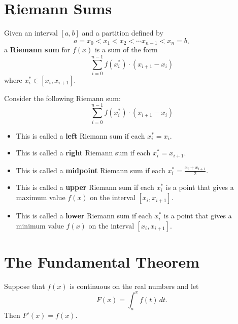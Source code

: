 \documentclass{ximera}
\renewcommand{\d}{\,d}
\begin{document}
\section{Riemann Sums}





\begin{definition}
Given an interval $[a,b]$ and a partition defined by
\[
a = x_0 < x_1 <x_2 < \cdots x_{n-1}< x_n = b,
\]
a \textbf{Riemann sum} for $f(x)$ is a sum of the form
\[
\sum_{i=0}^{n-1} f(x_i^*) \cdot (x_{i+1}-x_i)
\]
where $x_i^*\in [x_i,x_{i+1}]$.
\end{definition}




\begin{definition}
Consider the following Riemann sum:
\[
\sum_{i=0}^{n-1} f(x_i^*) \cdot (x_{i+1}-x_i)
\]
\begin{itemize}
\item This is called a \textbf{left} Riemann sum if each $x_i^* =
x_i$.
\item This is called a \textbf{right} Riemann sum if each $x_i^* =
x_{i+1}$.
\item This is called a \textbf{midpoint} Riemann sum if each $x_i^*
= \frac{x_i+x_{i+1}}{2}$.
\item This is called a \textbf{upper} Riemann sum if each $x_i^*$ is
a point that gives a maximum value $f(x)$ on the interval
$[x_i,x_{i+1}]$.
\item This is called a \textbf{lower} Riemann sum if each $x_i^*$ is a
point that gives a minimum value $f(x)$ on the interval
$[x_i,x_{i+1}]$.
\end{itemize}
\end{definition}







\section{The Fundamental Theorem}







\begin{theorem}
\label{thm:fundamental_theorem_I}\hfil
\noindent Suppose that $f(x)$ is continuous on the real numbers and let
\[
F(x)=\int_a^x f(t)\d t.
\]
Then $F'(x)=f(x)$.
\end{theorem}
\end{document}
